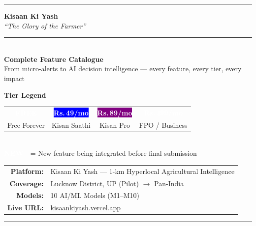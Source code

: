 \documentclass[12pt,a4paper]{article}
\newcommand{\Rup}{\textbf{Rs.\,}}
\newcommand{\freebadge}{\textcolor{white}{\colorbox{primaryGreen}{\footnotesize\textbf{FREE}}}}
\newcommand{\saathibadge}{\textcolor{white}{\colorbox{blue}{\footnotesize\textbf{\Rup49/mo}}}}
\newcommand{\probadge}{\textcolor{white}{\colorbox{purple}{\footnotesize\textbf{\Rup89/mo}}}}
\newcommand{\bizzbadge}{\textcolor{white}{\colorbox{amber}{\footnotesize\textbf{\Rup499/mo}}}}
\newcommand{\newbadge}{\textcolor{white}{\colorbox{rose}{\footnotesize\textbf{NEW}}}}
\begin{document}

\begin{titlepage}
\pagecolor{lightBg}
\centering
\vspace*{1.8cm}

{\color{primaryGreen}\rule{\linewidth}{2.5pt}}
\vspace{0.6cm}

{\Huge\bfseries\color{primaryGreen} Kisaan Ki Yash}\\[0.3cm]
{\large\color{deepTeal}\itshape ``The Glory of the Farmer''}\\[0.5cm]
{\color{sectionBar}\rule{0.4\linewidth}{1pt}}\\[0.8cm]

{\LARGE\bfseries\color{textDark} Complete Feature Catalogue}\\[0.3cm]
{\normalsize\color{gray} From micro-alerts to AI decision intelligence --- every feature, every tier, every impact}

\vspace{1.5cm}

\begin{tcolorbox}[colback=cardBg,colframe=primaryGreen,arc=10pt,boxrule=1.8pt,width=0.82\linewidth,center]
\centering
\textbf{\large\color{primaryGreen}Tier Legend}\\[8pt]
\begin{tabular}{cccc}
\freebadge & \saathibadge & \probadge & \bizzbadge \\[4pt]
Free Forever & Kisan Saathi & Kisan Pro & FPO / Business
\end{tabular}\\[8pt]
\newbadge\ \ {\small = New feature being integrated before final submission}
\end{tcolorbox}

\vspace{1.5cm}

\begin{tabular}{rl}
\textbf{\color{primaryGreen}Platform:} & Kisaan Ki Yash --- 1-km Hyperlocal Agricultural Intelligence \\[4pt]
\textbf{\color{primaryGreen}Coverage:} & Lucknow District, UP (Pilot) $\rightarrow$ Pan-India \\[4pt]
\textbf{\color{primaryGreen}Models:}   & 10 AI/ML Models (M1--M10) \\[4pt]
\textbf{\color{primaryGreen}Live URL:} & \href{https://kisaankiyash.vercel.app}{kisaankiyash.vercel.app} \\
\end{tabular}

\vfill
{\color{primaryGreen}\rule{\linewidth}{2.5pt}}
\end{titlepage}
\end{document}
